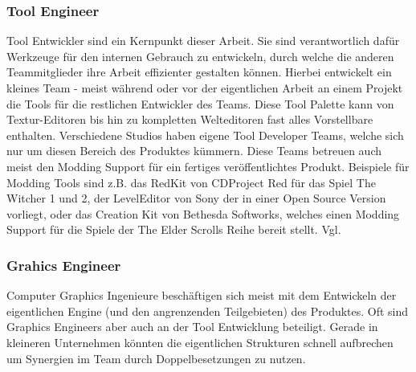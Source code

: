 \documentclass[pagesize, paper=a4, fontsize=12pt, titlepage=true, headings=small, headnosepline, abstractoff, liststotoc, nochapterprefix, plainheadsepline, twoside]{scrreprt}
\begin{document}
\subsubsection{Tool Engineer}
Tool Entwickler sind ein Kernpunkt dieser Arbeit. Sie sind verantwortlich dafür Werkzeuge für den internen Gebrauch zu entwickeln, durch welche die anderen Teammitglieder ihre Arbeit effizienter gestalten können. Hierbei entwickelt ein kleines Team - meist während oder vor der eigentlichen Arbeit an einem Projekt die Tools für die restlichen Entwickler des Teams. Diese Tool Palette kann von Textur-Editoren bis hin zu kompletten Welteditoren fast alles Vorstellbare enthalten. Verschiedene Studios haben eigene Tool Developer Teams, welche sich nur um diesen Bereich des Produktes kümmern. Diese Teams betreuen auch meist den Modding Support für ein fertiges veröffentlichtes Produkt. Beispiele für Modding Tools sind z.B. das RedKit von CDProject Red für das Spiel The Witcher 1 und 2, der LevelEditor von Sony der in einer Open Source Version vorliegt, oder das Creation Kit von Bethesda Softworks, welches einen Modding Support für die Spiele der The Elder Scrolls Reihe bereit stellt. Vgl. \parencite[S. 27 ]{Chandler2006}

\subsubsection{Grahics Engineer}
Computer Graphics Ingenieure beschäftigen sich meist mit dem Entwickeln der eigentlichen Engine (und den angrenzenden Teilgebieten) des Produktes. Oft sind Graphics Engineers aber auch an der Tool Entwicklung beteiligt. Gerade in kleineren Unternehmen könnten die eigentlichen Strukturen schnell aufbrechen um Synergien im Team durch Doppelbesetzungen zu nutzen. \parencite[S. 27 ]{Chandler2006}
\end{document}
